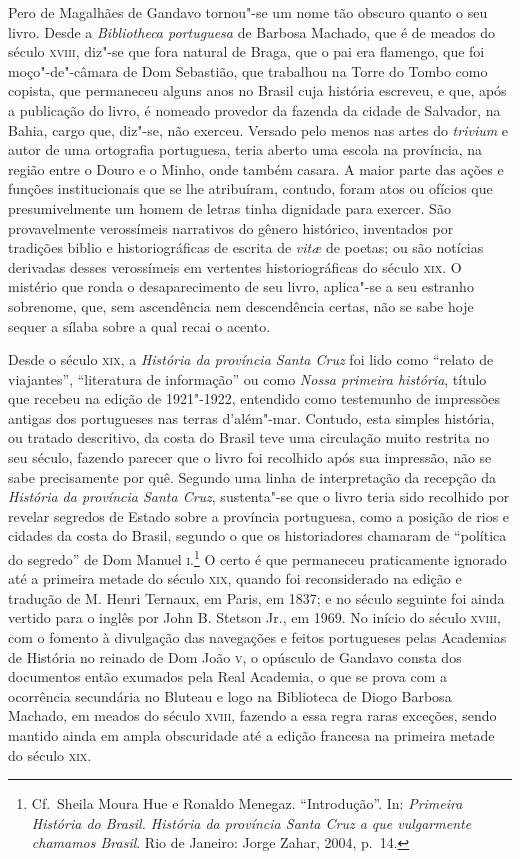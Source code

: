 Pero de Magalhães de Gandavo  tornou"-se um nome tão obscuro quanto o seu
livro. Desde a \textit{Bibliotheca portuguesa} de Barbosa Machado, que é de
meados do século \textsc{xviii}, diz"-se que fora natural de Braga, que o pai era
flamengo, que foi moço"-de"-câmara de Dom Sebastião, que trabalhou na
Torre do Tombo como copista, que permaneceu alguns anos no Brasil cuja
história escreveu, e que, após a publicação do livro, é nomeado
provedor da fazenda da cidade de Salvador, na Bahia, cargo que, diz"-se,
não exerceu. Versado pelo menos nas artes do \textit{trivium} e autor de uma
ortografia portuguesa, teria aberto uma escola na província, na região
entre o Douro e o Minho, onde também casara. A maior parte das ações e
funções institucionais que se lhe atribuíram, contudo, foram atos ou
ofícios que presumivelmente um homem de letras tinha dignidade para
exercer. São provavelmente verossímeis narrativos do gênero histórico,
inventados por tradições biblio e historiográficas de escrita de \textit{vit\ae}
de poetas; ou são notícias derivadas desses verossímeis em vertentes
historiográficas do século \textsc{xix}. O mistério que ronda o desaparecimento
de seu livro, aplica"-se a seu estranho sobrenome, que, sem ascendência
nem descendência certas, não se sabe hoje sequer a sílaba sobre a qual recai o acento.

Desde o século \textsc{xix}, a \textit{História da província Santa Cruz} foi lido como
``relato de viajantes'', ``literatura de informação'' ou como \textit{Nossa
primeira história}, título que recebeu na edição de 1921"-1922, entendido
como testemunho de impressões antigas dos portugueses nas terras
d'além"-mar. Contudo, esta simples história, ou tratado
descritivo, da costa do Brasil teve uma circulação muito restrita no
seu século, fazendo parecer que o livro foi recolhido após sua
impressão, não se sabe precisamente por quê. Segundo uma linha de
interpretação da recepção da \textit{História da província Santa Cruz},
sustenta"-se que o livro teria sido recolhido por revelar segredos de
Estado sobre a província portuguesa, como a posição de rios e cidades
da costa do Brasil, segundo o que os historiadores chamaram de
``política do segredo'' de Dom Manuel \textsc{i}.\footnote{ Cf.~Sheila 
Moura Hue e Ronaldo Menegaz.
``Introdução''. In:  \textit{Primeira História do
Brasil. História da província Santa Cruz a que vulgarmente chamamos
Brasil}. Rio de Janeiro: Jorge Zahar, 2004, p.~14.} O certo é que
permaneceu praticamente ignorado até a primeira metade do século \textsc{xix},
quando foi reconsiderado na edição e tradução de M. Henri Ternaux, em
Paris, em 1837; e no século seguinte foi ainda vertido para o inglês
por John B. Stetson Jr., em 1969. No início do século \textsc{xviii}, com o
fomento à divulgação das navegações e feitos portugueses pelas
Academias de História no reinado de Dom João \textsc{v}, o opúsculo de Gandavo
consta dos documentos então exumados pela Real Academia, o que se prova
com a ocorrência secundária no Bluteau e logo na Biblioteca de Diogo
Barbosa Machado, em meados do século \textsc{xviii}, fazendo a essa regra raras
exceções, sendo mantido ainda em ampla obscuridade até a edição
francesa na primeira metade do século \textsc{xix}.

